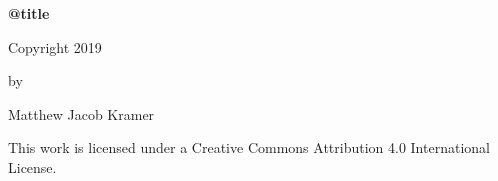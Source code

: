 \begin{center}
  \SingleSpacing \normalsize
  \textbf{\csname @title\endcsname}

  \vspace{5\baselineskip}
  Copyright 2019
  \par\vspace{\baselineskip} by
  \par\vspace{\baselineskip} Matthew Jacob Kramer

  \vspace{5\baselineskip}%
  This work is licensed under a Creative Commons Attribution 4.0 International
  License.
\end{center}

\clearpage
